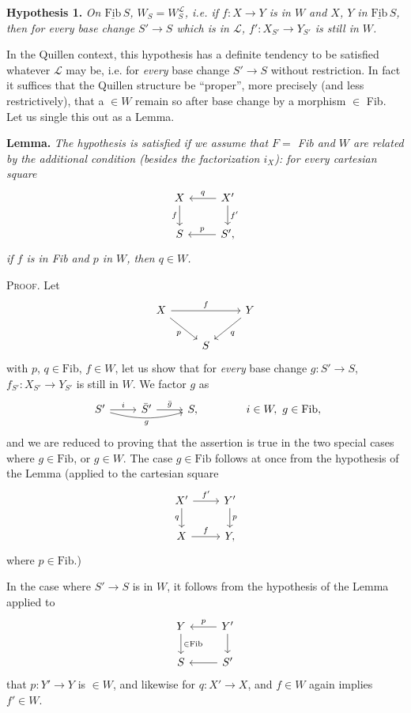 \documentclass[11pt]{article}
\newcommand{\printedpage}[1]{\marginpar{\footnotesize p.~#1}}
\newcommand{\msp}[1]{\marginpar{\footnotesize [#1]}}
\newcommand{\Fibu}{\underline{\mathrm{Fib}}\,}
\newcommand{\WL}{W_S^{\mathcal{L}}}
\begin{document}
\textbf{Hypothesis 1.} \textit{On $\Fibu S$, $W_S = \WL$, i.e. if $f : X \longrightarrow Y$ is in $W$ and $X$, $Y$ in $\Fibu S$, then for every base change $S' \longrightarrow S$ which is in $\mathcal{L}$, $f' : X_{S'} \longrightarrow Y_{S'}$ is still in $W$.}

In the Quillen context, this hypothesis has a definite tendency to be satisfied whatever $\mathcal{L}$ may be, i.e. for \textit{every} base change $S' \longrightarrow S$ without restriction. In fact it suffices that the Quillen structure be ``proper'', more precisely (and less restrictively), that a $\in W$ remain so after base change by a morphism $\in$ Fib. Let us single this out as a Lemma. %

\textbf{Lemma.} \textit{The hypothesis is satisfied if we assume} \msp{page 96} \textit{that $F =$ Fib and $W$ are related by the additional condition (besides the factorization $i_X$): for every cartesian square}
\[
\begin{tikzcd}
X \arrow[d, "f"'] & X' \arrow[l, "q"'] \arrow[d, "f'"] \\
S & S', \arrow[l, "p"']
\end{tikzcd}
\]
\textit{if $f$ is in Fib and $p$ in $W$, then $q \in W$.}

\textsc{Proof}. Let
\[
\begin{tikzcd}
X \arrow[rr, "f"] \arrow[dr, "p"'] & & Y \arrow[dl, "q"] \\
& S &
\end{tikzcd}
\]
with $p$, $q \in \mathrm{Fib}$, $f \in W$, let us show that for \textit{every} base change $g : S' \longrightarrow S$, $f_{S'} : X_{S'} \longrightarrow Y_{S'}$ is still in $W$. We factor $g$ as
\[
\begin{tikzcd}
S' \arrow[r, "i"] \arrow[rr, bend right=15, "g"'] & \bar{S}' \arrow[r, "\bar{g}"] & S,
\end{tikzcd}
\qquad\qquad i \in W,\ g \in \mathrm{Fib},
\]
 and we are reduced to proving that the assertion is true in the two special cases where $g \in \mathrm{Fib}$, or $g \in W$. The case $g \in \mathrm{Fib}$ follows at once from the hypothesis of the Lemma (applied to the cartesian square
\[
\begin{tikzcd}
X' \arrow[r, "f'"] \arrow[d, "q"'] & Y' \arrow[d, "p"] \\
X \arrow[r, "f"] & Y,
\end{tikzcd}
\]
\printedpage{61}
where $p \in \mathrm{Fib}$.)

In the case where $S' \longrightarrow S$ is in $W$, it follows from the hypothesis of the Lemma applied to
\[
\begin{tikzcd}
Y \arrow[d, "\in\mathrm{Fib}"] & Y' \arrow[l, "p"'] \arrow[d] \\
S & S' \arrow[l]
\end{tikzcd}
\]
that \msp{page 97} $p : Y' \longrightarrow Y$ is $\in W$, and likewise for $q : X' \longrightarrow X$, and $f \in W$ again implies $f' \in W$.
\end{document}
